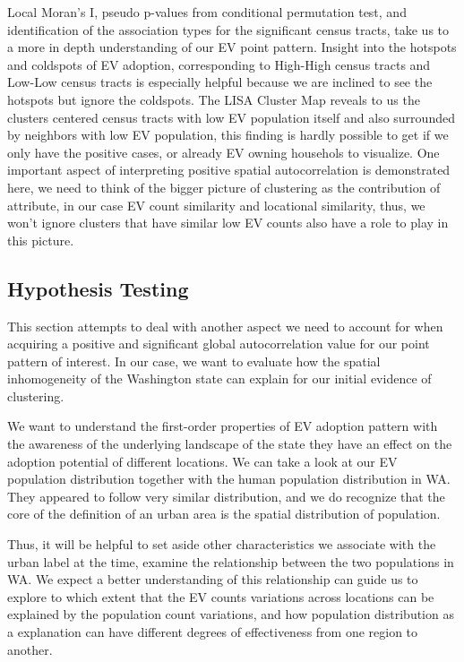 \documentclass[
  letterpaper,
  DIV=11,
  numbers=noendperiod]{scrartcl}
\makeatletter
\newcommand*\pandocbounded[1]{%
  \sbox\pandoc@box{#1}%
  \Gscale@div\@tempa{\textheight}{\dimexpr\ht\pandoc@box+\dp\pandoc@box\relax}%
  \Gscale@div\@tempb{\linewidth}{\wd\pandoc@box}%
  \ifdim\@tempb\p@<\@tempa\p@\let\@tempa\@tempb\fi%
  \ifdim\@tempa\p@<\p@\scalebox{\@tempa}{\usebox\pandoc@box}%
  \else\usebox{\pandoc@box}%
  \fi%
}
\makeatother
\begin{document}
\pandocbounded{\texttt{[image: image/manu-lisa-cluster.png]}}

Local Moran's I, pseudo p-values from conditional permutation test, and
identification of the association types for the significant census
tracts, take us to a more in depth understanding of our EV point
pattern. Insight into the hotspots and coldspots of EV adoption,
corresponding to High-High census tracts and Low-Low census tracts is
especially helpful because we are inclined to see the hotspots but
ignore the coldspots. The LISA Cluster Map reveals to us the clusters
centered census tracts with low EV population itself and also surrounded
by neighbors with low EV population, this finding is hardly possible to
get if we only have the positive cases, or already EV owning househols
to visualize. One important aspect of interpreting positive spatial
autocorrelation is demonstrated here, we need to think of the bigger
picture of clustering as the contribution of attribute, in our case EV
count similarity and locational similarity, thus, we won't ignore
clusters that have similar low EV counts also have a role to play in
this picture.

\subsection{Hypothesis Testing}\label{hypothesis-testing}

This section attempts to deal with another aspect we need to account for
when acquiring a positive and significant global autocorrelation value
for our point pattern of interest. In our case, we want to evaluate how
the spatial inhomogeneity of the Washington state can explain for our
initial evidence of clustering.

We want to understand the first-order properties of EV adoption pattern
with the awareness of the underlying landscape of the state they have an
effect on the adoption potential of different locations. We can take a
look at our EV population distribution together with the human
population distribution in WA. They appeared to follow very similar
distribution, and we do recognize that the core of the definition of an
urban area is the spatial distribution of population.

Thus, it will be helpful to set aside other characteristics we associate
with the urban label at the time, examine the relationship between the
two populations in WA. We expect a better understanding of this
relationship can guide us to explore to which extent that the EV counts
variations across locations can be explained by the population count
variations, and how population distribution as a explanation can have
different degrees of effectiveness from one region to another.
\end{document}
